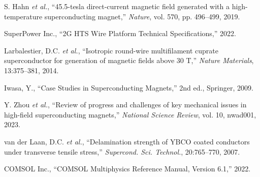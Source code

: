 \documentclass[10pt,twocolumn]{article}
\begin{document}
\begin{thebibliography}{8}

S. Hahn \emph{et al.}, ``45.5-tesla direct-current magnetic field generated with a high-temperature superconducting magnet,'' \textit{Nature}, vol. 570, pp. 496--499, 2019.

SuperPower Inc., ``2G HTS Wire Platform Technical Specifications,'' 2022.

Larbalestier, D.C. \emph{et al.}, ``Isotropic round-wire multifilament cuprate superconductor for generation of magnetic fields above 30 T,'' \textit{Nature Materials}, 13:375--381, 2014.

Iwasa, Y., ``Case Studies in Superconducting Magnets,'' 2nd ed., Springer, 2009.

Y. Zhou \emph{et al.}, ``Review of progress and challenges of key mechanical issues in high-field superconducting magnets,'' \textit{National Science Review}, vol. 10, nwad001, 2023.

van der Laan, D.C. \emph{et al.}, ``Delamination strength of YBCO coated conductors under transverse tensile stress,'' \textit{Supercond. Sci. Technol.}, 20:765--770, 2007.

COMSOL Inc., ``COMSOL Multiphysics Reference Manual, Version 6.1,'' 2022.

\end{thebibliography}
\end{document}
